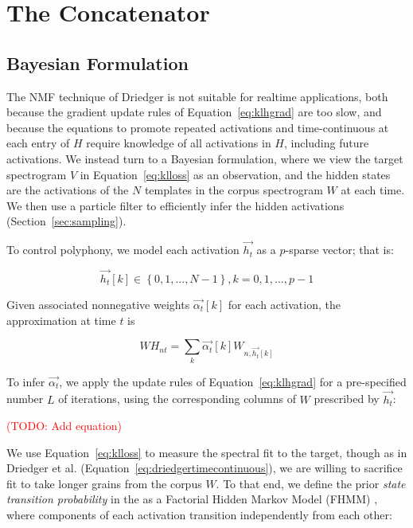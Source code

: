 \documentclass{article}
\newcommand{\ChrisEdit}[1]{\textcolor{red}{(#1)}}
\begin{document}
\section{The Concatenator}

\subsection{Bayesian Formulation}
\label{sec:bayesian}

    The NMF technique of Driedger is not suitable for realtime applications, both because the gradient update rules of Equation~\ref{eq:klhgrad} are too slow, and because the equations to promote repeated activations and time-continuous at each entry of $H$ require knowledge of all activations in $H$, including future activations.  We instead turn to a Bayesian formulation, where we view the target spectrogram $V$ in Equation~\ref{eq:klloss} as an observation, and the hidden states are the activations of the $N$ templates in the corpus spectrogram $W$ at each time.  We then use a particle filter to efficiently infer the hidden activations (Section~\ref{sec:sampling}).
    
    To control polyphony, we model each activation $\vec{h_t}$ as a $p$-sparse vector; that is:

    \begin{equation} 
        \vec{h_t}[k] \in \left\{0, 1, ..., N-1\right\}, k = 0, 1, ..., p-1 
    \end{equation}

    Given associated nonnegative weights $\vec{\alpha_t}[k]$ for each activation, the approximation at time $t$ is 
    
    \begin{equation}
        WH_{nt} = \sum_{k} \vec{\alpha_t}[k]  W_{n, \vec{h_t}[k]}
    \end{equation}

    To infer $\vec{\alpha_t}$, we apply the update rules of Equation~\ref{eq:klhgrad} for a pre-specified number $L$ of iterations, using the corresponding columns of $W$ prescribed by $\vec{h_t}$:
    
    \ChrisEdit{TODO: Add equation}
    
    We use Equation~\ref{eq:klloss} to measure the spectral fit to the target, though as in Driedger et al. \cite{driedger2015let} (Equation~\ref{eq:driedgertimecontinuous}), we are willing to sacrifice fit to take longer grains from the corpus $W$.  To that end, we define the prior {\em state transition probability} in the as a Factorial Hidden Markov Model (FHMM) \cite{ghahramani1995factorial}, where components of each activation transition independently from each other:
\end{document}
